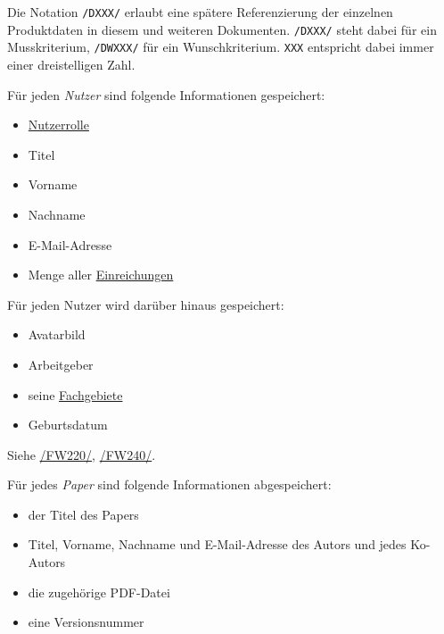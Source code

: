 
Die Notation \texttt{/DXXX/} erlaubt eine spätere Referenzierung der einzelnen Produktdaten in diesem und weiteren
Dokumenten. \texttt{/DXXX/} steht dabei für ein Musskriterium, \texttt{/DWXXX/} für ein Wunschkriterium. \texttt{XXX} entspricht dabei immer einer dreistelligen Zahl.

\begin{description}

	 Für jeden \emph{Nutzer} sind folgende Informationen gespeichert:
	\begin{itemize}
		\item \hyperref[produktfunktionen]{Nutzerrolle}
		\item Titel
		\item Vorname
		\item Nachname
		\item E-Mail-Adresse
		\item Menge aller \hyperref[d025]{Einreichungen}
	\end{itemize}

	 Für jeden Nutzer wird darüber hinaus gespeichert:
	\begin{itemize}
		\item Avatarbild
		\item Arbeitgeber
		\item seine \hyperref[d035]{Fachgebiete}
		\item Geburtsdatum
	\end{itemize}
	Siehe \hyperref[funkt:220]{/FW220/}, \hyperref[funkt:240]{/FW240/}.

	 Für jedes \emph{Paper} sind folgende Informationen abgespeichert:
	\begin{itemize}
		\item der Titel des Papers
		\item Titel, Vorname, Nachname und E-Mail-Adresse des Autors und jedes Ko-Autors
		\item die zugehörige PDF-Datei
		\item eine Versionsnummer
	\end{itemize}


\end{description}
